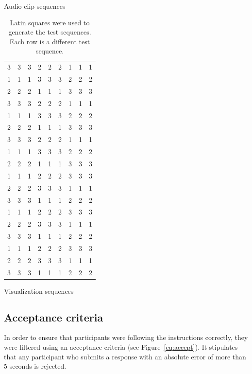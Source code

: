 \begin{table}
\begin{subtable}{.5\textwidth}
{  }
    \caption{Audio clip sequences}
    \label{tab:clipseq}
\end{subtable}%
\begin{subtable}{.5\textwidth}
    \centering
    {\small
    \begin{tabular}{rrrrrrrrr}
      3 & 3 & 3 & 2 & 2 & 2 & 1 & 1 & 1 \\ 
      1 & 1 & 1 & 3 & 3 & 3 & 2 & 2 & 2 \\ 
      2 & 2 & 2 & 1 & 1 & 1 & 3 & 3 & 3 \\ 
      3 & 3 & 3 & 2 & 2 & 2 & 1 & 1 & 1 \\ 
      1 & 1 & 1 & 3 & 3 & 3 & 2 & 2 & 2 \\ 
      2 & 2 & 2 & 1 & 1 & 1 & 3 & 3 & 3 \\ 
      3 & 3 & 3 & 2 & 2 & 2 & 1 & 1 & 1 \\ 
      1 & 1 & 1 & 3 & 3 & 3 & 2 & 2 & 2 \\ 
      2 & 2 & 2 & 1 & 1 & 1 & 3 & 3 & 3 \\ 
      1 & 1 & 1 & 2 & 2 & 2 & 3 & 3 & 3 \\ 
      2 & 2 & 2 & 3 & 3 & 3 & 1 & 1 & 1 \\ 
      3 & 3 & 3 & 1 & 1 & 1 & 2 & 2 & 2 \\ 
      1 & 1 & 1 & 2 & 2 & 2 & 3 & 3 & 3 \\ 
      2 & 2 & 2 & 3 & 3 & 3 & 1 & 1 & 1 \\ 
      3 & 3 & 3 & 1 & 1 & 1 & 2 & 2 & 2 \\ 
      1 & 1 & 1 & 2 & 2 & 2 & 3 & 3 & 3 \\ 
      2 & 2 & 2 & 3 & 3 & 3 & 1 & 1 & 1 \\ 
      3 & 3 & 3 & 1 & 1 & 1 & 2 & 2 & 2 \\ 
    \end{tabular}
  }
    \caption{Visualization sequences}
    \label{tab:visseq}
\end{subtable}
\caption{Latin squares were used to generate the test sequences. Each row is a different test sequence.}
\label{fig:sequence}
\end{table}

\subsection{Acceptance criteria}\label{sec:study1-acceptance}
In order to ensure that participants were following the instructions correctly, they were filtered using an acceptance
criteria (see Figure~\ref{eq:accept}).  It stipulates that any participant who submits a response with an absolute
error of more than 5 seconds is rejected.

